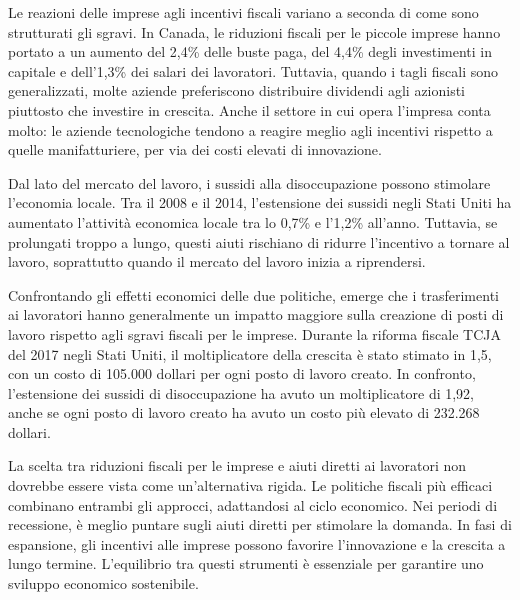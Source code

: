 \documentclass[12pt]{book} %
\begin{document}
Le reazioni delle imprese agli incentivi fiscali variano a seconda di come sono strutturati gli sgravi. In Canada, le riduzioni fiscali per le piccole imprese hanno portato a un aumento del 2,4\% delle buste paga, del 4,4\% degli investimenti in capitale e dell'1,3\% dei salari dei lavoratori. Tuttavia, quando i tagli fiscali sono generalizzati, molte aziende preferiscono distribuire dividendi agli azionisti piuttosto che investire in crescita. Anche il settore in cui opera l'impresa conta molto: le aziende tecnologiche tendono a reagire meglio agli incentivi rispetto a quelle manifatturiere, per via dei costi elevati di innovazione.

Dal lato del mercato del lavoro, i sussidi alla disoccupazione possono stimolare l'economia locale. Tra il 2008 e il 2014, l'estensione dei sussidi negli Stati Uniti ha aumentato l'attività economica locale tra lo 0,7\% e l'1,2\% all'anno. Tuttavia, se prolungati troppo a lungo, questi aiuti rischiano di ridurre l'incentivo a tornare al lavoro, soprattutto quando il mercato del lavoro inizia a riprendersi.

Confrontando gli effetti economici delle due politiche, emerge che i trasferimenti ai lavoratori hanno generalmente un impatto maggiore sulla creazione di posti di lavoro rispetto agli sgravi fiscali per le imprese. Durante la riforma fiscale TCJA del 2017 negli Stati Uniti, il moltiplicatore della crescita è stato stimato in 1,5, con un costo di 105.000 dollari per ogni posto di lavoro creato. In confronto, l'estensione dei sussidi di disoccupazione ha avuto un moltiplicatore di 1,92, anche se ogni posto di lavoro creato ha avuto un costo più elevato di 232.268 dollari.

La scelta tra riduzioni fiscali per le imprese e aiuti diretti ai lavoratori non dovrebbe essere vista come un'alternativa rigida. Le politiche fiscali più efficaci combinano entrambi gli approcci, adattandosi al ciclo economico. Nei periodi di recessione, è meglio puntare sugli aiuti diretti per stimolare la domanda. In fasi di espansione, gli incentivi alle imprese possono favorire l'innovazione e la crescita a lungo termine. L'equilibrio tra questi strumenti è essenziale per garantire uno sviluppo economico sostenibile.
\end{document}
